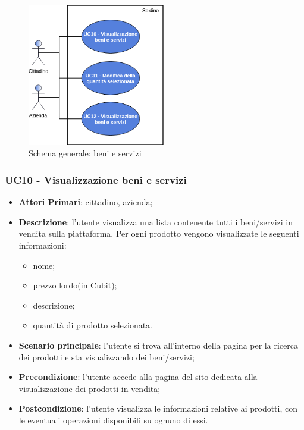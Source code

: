 \begin{figure}[H]
	\includegraphics[width=6cm]{res/images/benieservizi.png}
	\centering
	\caption{Schema generale: beni e servizi}
\end{figure}
\subsubsection{UC10 - Visualizzazione beni e servizi}

 \begin{itemize}
 	\item \textbf{Attori Primari}: cittadino, azienda;
 	\item \textbf{Descrizione}: l'utente visualizza una lista contenente tutti i beni/servizi in vendita sulla piattaforma. Per ogni prodotto vengono visualizzate le seguenti informazioni:
 	\begin{itemize}
 		\item nome;
 		\item prezzo lordo\glosp (in Cubit\glo);
 		\item descrizione;
 		\item quantità di prodotto selezionata.
 	\end{itemize}
 	
 	\item \textbf{Scenario principale}: l'utente si trova all'interno della pagina per la ricerca dei prodotti e sta visualizzando dei beni/servizi;	
 	\item \textbf{Precondizione}: l'utente accede alla pagina del sito dedicata alla visualizzazione dei prodotti in vendita;
 	\item \textbf{Postcondizione}: l'utente visualizza le informazioni relative ai prodotti, con le eventuali operazioni disponibili su ognuno di essi.
 \end{itemize}

